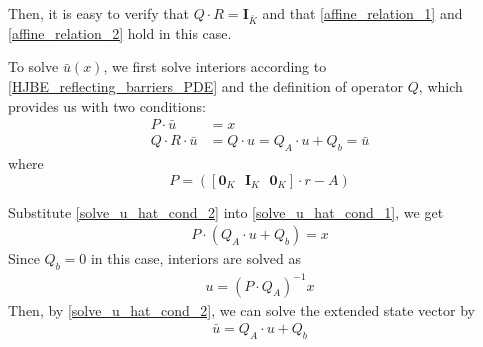 \documentclass[11pt]{article}
\begin{document}
Then, it is easy to verify that $Q \cdot R = \mathbf{I}_{\bar{K}}$ and that \eqref{affine_relation_1} and \eqref{affine_relation_2} hold in this case.

To solve $\bar{u}(x)$, we first solve interiors according to \eqref{HJBE_reflecting_barriers_PDE} and the definition of operator $Q$, which provides us with two conditions:
\begin{align}
P\cdot\bar{u} &= x\label{solve_u_hat_cond_1}\\
Q\cdot R\cdot\bar{u} &= Q\cdot u = Q_A\cdot u+Q_b = \bar{u}\label{solve_u_hat_cond_2}
\end{align}
where
\begin{equation}
P = ([\mathbf{0}_{K} \text{ } \mathbf{I}_{K} \text{ } \mathbf{0}_{K}]\cdot r - A)
\label{P_definition}
\end{equation} 
\iffalse
\begin{align}
P &= \begin{bmatrix}
0&r&0&\cdots&0&0&0\\
0&0&r&\cdots&0&0&0\\
\vdots&\vdots&\vdots&\ddots&\vdots&\vdots&\vdots\\
0&0&0&\cdots&r&0&0\\
0&0&0&\cdots&0&r&0\\
\end{bmatrix}_{K\times\bar{K}}-A  \\
&= \begin{bmatrix}
-1&2(1+r\Delta^2)&-1&\dots&0&0&0\\
0&-1&2(1+r\Delta^2)&\dots&0&0&0\\
\vdots&\vdots&\vdots&\ddots&\vdots&\vdots&\vdots\\
0&0&0&\dots&2(1+r\Delta^2)&-1&0\\
0&0&0&\cdots&-1&2(1+r\Delta^2)&-1
\end{bmatrix}\frac{\Delta^{-2}}{2}
\end{align}
\fi
Substitute \eqref{solve_u_hat_cond_2} into \eqref{solve_u_hat_cond_1}, we get
\begin{align}
P\cdot(Q_A\cdot u+Q_b) = x
\end{align}
Since $Q_b = 0$ in this case, interiors are solved as
\begin{align}
u = (P\cdot Q_A)^{-1}x
\end{align}
Then, by \eqref{solve_u_hat_cond_2}, we can solve the extended state vector by
\begin{align}
\bar{u} = Q_A\cdot u+Q_b\label{solve_u_hat_in_terms_of_interiors}
\end{align}
\end{document}
